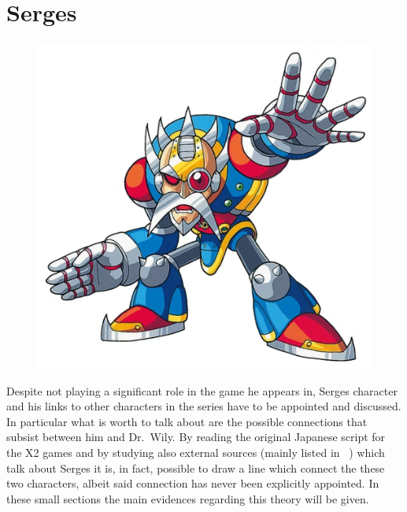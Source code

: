 
\section{Serges} \label{char:Serges}
\begin{figure}[h]
	\centering
	\includegraphics[width=0.4\linewidth]{figures/Characters/Char_Serges.png}
\end{figure}
Despite not playing a significant role in the game he appears in, Serges character and his links to other characters in the series have to be appointed and discussed. In particular what is worth to talk about are the possible connections that subsist between him and Dr.~Wily. By reading the original Japanese script for the X2 games and by studying also external sources (mainly listed in ~\cite{art:Serges_and_Isoc}) which talk about Serges it is, in fact, possible to draw a line which connect the
these two characters, albeit said connection has never been explicitly appointed. In these small sections the main evidences regarding this theory will be given.

